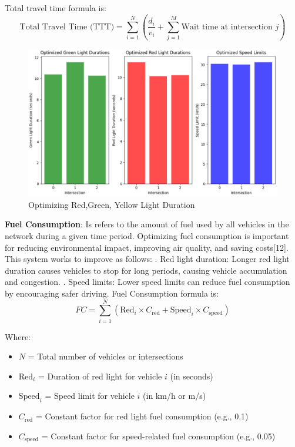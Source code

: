 Total travel time formula is:
\[
\text{Total Travel Time (TTT)} = \sum_{i=1}^{N} \left( \frac{d_i}{v_i} + \sum_{j=1}^{M} \text{Wait time at intersection } j \right)
\]
\begin{figure}[H]
    \centering
    \includegraphics[width=1\linewidth]{figures/Optimizing_light_duration.PNG}
    \caption{Optimizing Red,Green, Yellow Light Duration}
    \label{fig:Optimizing Red,Green, Yellow Light Duration}
\end{figure}
\textbf{Fuel Consumption}: Is refers to the amount of fuel used by all vehicles in the network during a given time period. Optimizing fuel consumption is important for reducing environmental impact, improving air quality, and saving costs[12].
\newline
This system works to improve as follows:
. Red light duration: Longer red light duration causes vehicles to stop for long periods, causing vehicle accumulation and congestion.
. Speed limits: Lower speed limits can reduce fuel consumption by encouraging safer driving.
\newline
Fuel Consumption formula is:
\newline
\[
FC = \sum_{i=1}^{N} \left( \text{Red}_i \times C_{\text{red}} + \text{Speed}_i \times C_{\text{speed}} \right)
\]

Where:
\begin{itemize}
    \item \( N \) = Total number of vehicles or intersections
    \item \( \text{Red}_i \) = Duration of red light for vehicle \( i \) (in seconds)
    \item \( \text{Speed}_i \) = Speed limit for vehicle \( i \) (in km/h or m/s)
    \item \( C_{\text{red}} \) = Constant factor for red light fuel consumption (e.g., 0.1)
    \item \( C_{\text{speed}} \) = Constant factor for speed-related fuel consumption (e.g., 0.05)
\end{itemize}
